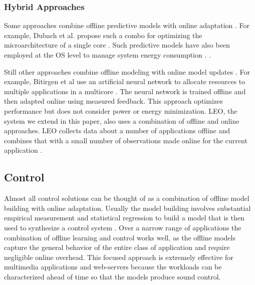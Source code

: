\subsubsection{Hybrid Approaches}
Some approaches combine offline predictive models with online
adaptation
\cite{Zhang2012,packandcap,Winter2010,dubach2010,Koala,Cinder,
  wu2012inferred}.  For example, Dubach et al.  propose such a combo
for optimizing the microarchitecture of a single core
\cite{dubach2010}.  Such predictive models have also been employed at
the OS level to manage system energy consumption \cite{Koala,Cinder}.
\cite{wu2012inferred}.


Still other approaches combine offline modeling with online model
updates \cite{JouleGuard,Bitirgen2008,Ipek}.  For example, Bitirgen et
al use an artificial neural network to allocate resources to multiple
applications in a multicore \cite{Bitirgen2008}.  The neural network
is trained offline and then adapted online using measured feedback.
This approach optimizes performance but does not consider power or
energy minimization.  LEO, the system we extend in this paper, also
uses a combination of offline and online approaches.  LEO collects
data about a number of applications offline and combines that with a
small number of observations made online for the current application
\cite{LEO}.

\subsection{Control}
Almost all control solutions can be thought of as a combination of
offline model building with online adaptation.  Usually the model
building involves substantial empirical measurement and statistical
regression to build a model that is then used to synthesize a control
system
\cite{Wu2004,TCST,Chen2011,PTRADE,POET,ControlWare,Agilos,Rajkumar,Sojka,Raghavendra2008}.
Over a narrow range of applications the combination of offline
learning and control works well, as the offline models capture the
general behavior of the entire class of application and require
negligible online overhead.  This focused approach is extremely
effective for multimedia applications
\cite{grace2,flinn99,flinn2004,xtune,TCST} and web-servers
\cite{Horvarth,LuEtAl-2006a,SunDaiPan-2008a} because the workloads can
be characterized ahead of time so that the models produce sound
control.


